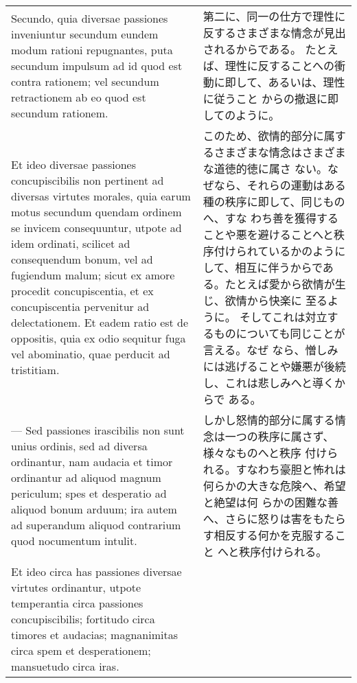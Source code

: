 \documentclass[10pt]{jsarticle}
\begin{document}
\begin{longtable}{p{21em}p{21em}}
 
 \\

 

 Secundo, quia diversae passiones inveniuntur secundum eundem modum
 rationi repugnantes, puta secundum impulsum ad id quod est contra
 rationem; vel secundum retractionem ab eo quod est secundum
 rationem. 

&

 第二に、同一の仕方で理性に反するさまざまな情念が見出されるからである。
 たとえば、理性に反することへの衝動に即して、あるいは、理性に従うこと
 からの撤退に即してのように。

 
\\


 Et ideo diversae passiones concupiscibilis non pertinent ad diversas
 virtutes morales, quia earum motus secundum quendam ordinem se
 invicem consequuntur, utpote ad idem ordinati, scilicet ad
 consequendum bonum, vel ad fugiendum malum; sicut ex amore procedit
 concupiscentia, et ex concupiscentia pervenitur ad delectationem.  Et
 eadem ratio est de oppositis, quia ex odio sequitur fuga vel
 abominatio, quae perducit ad tristitiam.
 
 &

 このため、欲情的部分に属するさまざまな情念はさまざまな道徳的徳に属さ
 ない。なぜなら、それらの運動はある種の秩序に即して、同じものへ、すな
 わち善を獲得することや悪を避けることへと秩序付けられているかのように
 して、相互に伴うからである。たとえば愛から欲情が生じ、欲情から快楽に
 至るように。 そしてこれは対立するものについても同じことが言える。なぜ
 なら、憎しみには逃げることや嫌悪が後続し、これは悲しみへと導くからで
 ある。

 \\

 --- Sed passiones irascibilis non sunt unius ordinis, sed ad diversa
 ordinantur, nam audacia et timor ordinantur ad aliquod magnum
 periculum; spes et desperatio ad aliquod bonum arduum; ira autem ad
 superandum aliquod contrarium quod nocumentum intulit.


 
 
&

 しかし怒情的部分に属する情念は一つの秩序に属さず、様々なものへと秩序
 付けられる。すなわち豪胆と怖れは何らかの大きな危険へ、希望と絶望は何
 らかの困難な善へ、さらに怒りは害をもたらす相反する何かを克服すること
 へと秩序付けられる。

 
\\

Et ideo circa
 has passiones diversae virtutes ordinantur, utpote temperantia circa
 passiones concupiscibilis; fortitudo circa timores et audacias;
 magnanimitas circa spem et desperationem; mansuetudo circa iras.


\end{longtable}
\end{document}
